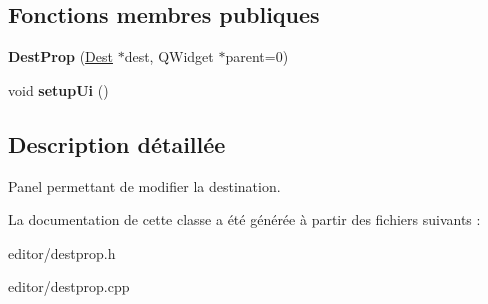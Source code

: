 \subsection*{Fonctions membres publiques}
\begin{DoxyCompactItemize}
\item 
\hypertarget{classDestProp_accf41a3f4a376030696fca6daff74cff}{{\bfseries Dest\+Prop} (\hyperlink{classDest}{Dest} $\ast$dest, Q\+Widget $\ast$parent=0)}\label{classDestProp_accf41a3f4a376030696fca6daff74cff}

\item 
\hypertarget{classDestProp_a41ab256b3cb0fe805f1078d232802439}{void {\bfseries setup\+Ui} ()}\label{classDestProp_a41ab256b3cb0fe805f1078d232802439}

\end{DoxyCompactItemize}


\subsection{Description détaillée}
Panel permettant de modifier la destination. 

La documentation de cette classe a été générée à partir des fichiers suivants \+:\begin{DoxyCompactItemize}
\item 
editor/destprop.\+h\item 
editor/destprop.\+cpp\end{DoxyCompactItemize}
